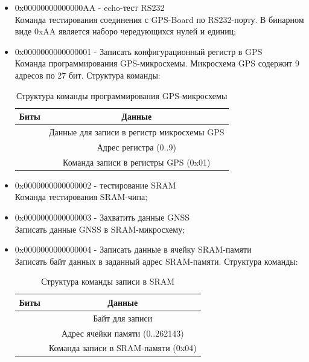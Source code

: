 \begin{itemize}
\item 0x00000000000000AA - echo-тест RS232 \\
	Команда тестирования соединения с GPS-Board по RS232-порту. В бинарном виде 0xAA является наборо чередующихся нулей и единиц;

\item 0x0000000000000001 - Записать конфигурационный регистр в GPS \\ 
	Команда программирования GPS-микросхемы. Микросхема GPS содержит 9 адресов по 27 бит. Структура команды:
	\begin{table}[H]
	\begin{center}
	\caption{Структура команды программирования GPS-микросхемы}
	\label{tab:gps_programm_comm}
	\begin{tabular}{|c|c|}
		\hline
			Биты & Данные \\
		\hline
			[39:12] & Данные для записи в регистр микросхемы GPS \\
		\hline
			[11:08] & Адрес регистра (0..9) \\
		\hline
			[07:00] & Команда записи в регистры GPS (0x01) \\
		\hline
	\end{tabular}
	\end{center}
	\end{table}

\item 0x0000000000000002 - тестирование SRAM \\ 
	Команда тестирования SRAM-чипа;

\item 0x0000000000000003 - Захватить данные GNSS \\ 
	Записать данные GNSS в SRAM-микросхему;

\item 0x0000000000000004 - Записать данные в ячейку SRAM-памяти \\ 
	Записать байт данных в заданный адрес SRAM-памяти. Структура команды:
	\begin{table}[H]
	\begin{center}
	\caption{Структура команды записи в SRAM}
	\label{tab:write_sram}
	\begin{tabular}{|c|c|}
		\hline
			Биты & Данные \\
		\hline
			[33:26] & Байт для записи \\
		\hline
			[25:08] & Адрес ячейки памяти (0..262143) \\
		\hline
			[07:00] & Команда записи в SRAM-памяти (0x04) \\
		\hline
	\end{tabular}
	\end{center}
	\end{table}


\end{itemize}
